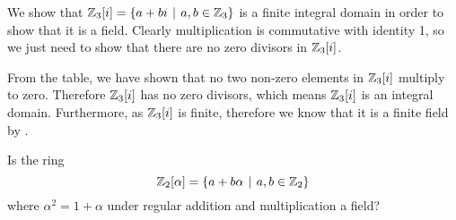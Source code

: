 \begin{example}
    We show that $\Z_3[i] = \{a+bi \vert a,b \in \Z_3\}$ is a finite integral domain in order to show that it is a field. Clearly multiplication is commutative with identity 1, so we just need to show that there are no zero divisors in $\mathbb{Z}_3[i]$.
    \begin{table}[h]
        \centering
    \end{table}
    
    From the table, we have shown that no two non-zero elements in $\mathbb{Z}_3[i]$ multiply to zero. Therefore $\mathbb{Z}_3[i]$ has no zero divisors, which means $\mathbb{Z}_3[i]$ is an integral domain. Furthermore, as $\mathbb{Z}_3[i]$ is finite, therefore we know that it is a finite field by .
\end{example}

\begin{exercise}\label{exercise-Zn2[alpha]}
    Is the ring
    \[
        \Z_2[\alpha] = \{a+b\alpha \vert a,b\in\Z_2\}
    \]
    where $\alpha^2 = 1 + \alpha$ under regular addition and multiplication a field?
\end{exercise}

